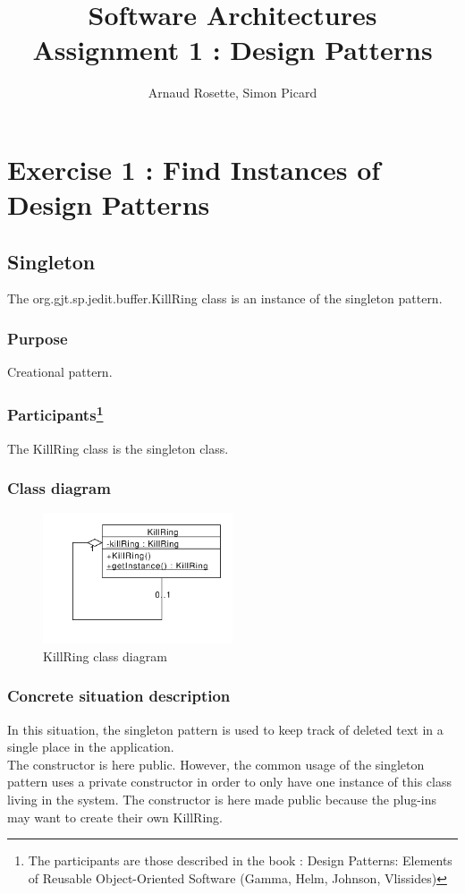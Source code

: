 \documentclass[a4paper,10pt]{article}
\title{Software Architectures\\ Assignment 1 : Design Patterns}
\author{Arnaud Rosette, Simon Picard}
\begin{document}
\maketitle
\section{Exercise 1 : Find Instances of Design Patterns}
\subsection{Singleton}
The org.gjt.sp.jedit.buffer.KillRing class is an instance of the singleton pattern.

\subsubsection{Purpose}
Creational pattern.
\subsubsection[Participants]{Participants\footnote[1]{The participants are those described in the book : Design Patterns: Elements of Reusable Object-Oriented Software (Gamma, Helm, Johnson, Vlissides)}}
The KillRing class is the singleton class.
\subsubsection{Class diagram}
\begin{center}
\begin{figure}[h]
  \centerline{\includegraphics[width=0.5\textwidth]{singleton-killring-class-diagram.pdf}}
  \caption{KillRing class diagram}
\end{figure}
\end{center}
\subsubsection{Concrete situation description}
In this situation, the singleton pattern is used to keep track of deleted text in a single place in the application.\\
The constructor is here public. However, the common usage of the singleton pattern uses a private constructor in order to only have one instance of this class living in the system. The constructor is here made public because the plug-ins may want to create their own KillRing. 
\end{document}
